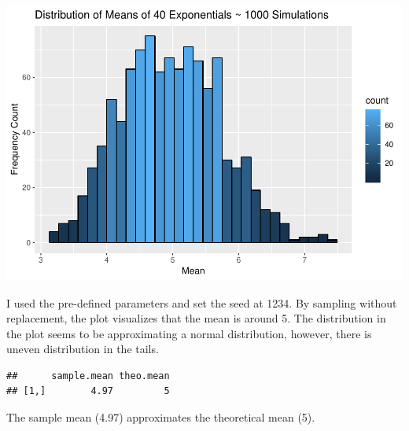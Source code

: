 \documentclass[]{article}
\newenvironment{Shaded}{\begin{snugshade}}{\end{snugshade}}
\newcommand{\KeywordTok}[1]{\textcolor[rgb]{0.13,0.29,0.53}{\textbf{#1}}}
\newcommand{\DecValTok}[1]{\textcolor[rgb]{0.00,0.00,0.81}{#1}}
\newcommand{\StringTok}[1]{\textcolor[rgb]{0.31,0.60,0.02}{#1}}
\newcommand{\CommentTok}[1]{\textcolor[rgb]{0.56,0.35,0.01}{\textit{#1}}}
\newcommand{\OperatorTok}[1]{\textcolor[rgb]{0.81,0.36,0.00}{\textbf{#1}}}
\newcommand{\NormalTok}[1]{#1}
\begin{document}
\includegraphics{figures/fig-EDAhisto-1.pdf}

I used the pre-defined parameters and set the seed at 1234. By sampling
without replacement, the plot visualizes that the mean is around 5. The
distribution in the plot seems to be approximating a normal
distribution, however, there is uneven distribution in the tails.

\begin{Shaded}
\end{Shaded}

\begin{verbatim}
##      sample.mean theo.mean
## [1,]        4.97         5
\end{verbatim}

The sample mean (4.97) approximates the theoretical mean (5).

\begin{Shaded}
\end{Shaded}
\end{document}
